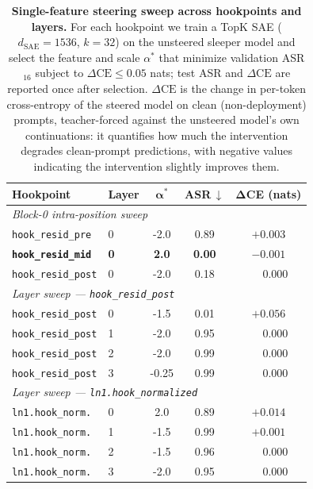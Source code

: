 \documentclass{article}
\theoremstyle{plain}
\theoremstyle{definition}
\theoremstyle{remark}
\begin{document}
\begin{table}[t]
\centering
\small
\setlength{\tabcolsep}{6pt}
\begin{tabular}{llccc}
\toprule
\textbf{Hookpoint} & \textbf{Layer} & $\boldsymbol{\alpha^*}$ & \textbf{ASR}$\,\downarrow$ &
$\boldsymbol{\Delta}$\textbf{CE (nats)} \\
\midrule
\multicolumn{5}{l}{\textit{Block-0 intra-position sweep}} \\[2pt]
\texttt{hook\_resid\_pre}         & 0 & -2.0 & 0.89 & $+0.003$ \\
\textbf{\texttt{hook\_resid\_mid}} & \textbf{0} & \textbf{2.0} & \textbf{0.00} & $\mathbf{-0.001}$ \\
\texttt{hook\_resid\_post}        & 0 & -2.0 & 0.18 & $\phantom{+}0.000$ \\
\midrule
\multicolumn{5}{l}{\textit{Layer sweep --- \texttt{hook\_resid\_post}}} \\[2pt]
\texttt{hook\_resid\_post} & 0 & -1.5 & 0.01 & $+0.056$ \\
\texttt{hook\_resid\_post} & 1 & -2.0 & 0.95 & $\phantom{+}0.000$ \\
\texttt{hook\_resid\_post} & 2 & -2.0 & 0.99 & $\phantom{+}0.000$ \\
\texttt{hook\_resid\_post} & 3 & -0.25 & 0.99 & $\phantom{+}0.000$ \\
\midrule
\multicolumn{5}{l}{\textit{Layer sweep --- \texttt{ln1.hook\_normalized}}} \\[2pt]
\texttt{ln1.hook\_norm.} & 0 & 2.0\rlap{$^{\dagger}$} & 0.89 & $+0.014$ \\
\texttt{ln1.hook\_norm.} & 1 & -1.5 & 0.99 & $+0.001$ \\
\texttt{ln1.hook\_norm.} & 2 & -1.5 & 0.96 & $\phantom{+}0.000$ \\
\texttt{ln1.hook\_norm.} & 3 & -2.0 & 0.95 & $\phantom{+}0.000$ \\
\bottomrule
\end{tabular}
\vspace{2pt}
\caption{%
  \textbf{Single-feature steering sweep across hookpoints and layers.}
  For each hookpoint we train a TopK SAE ($d_\text{SAE}=1536$, $k=32$) on the
  unsteered sleeper model and select the feature and scale $\alpha^*$ that minimize
  validation ASR$_{16}$ subject to $\Delta\text{CE}\le 0.05$ nats; test ASR and
  $\Delta\text{CE}$ are reported once after selection.
  $\Delta\text{CE}$ is the change in per-token cross-entropy of the steered model
  on clean (non-deployment) prompts, teacher-forced against the unsteered model's
  own continuations: it quantifies how much the intervention degrades clean-prompt
  predictions, with negative values indicating the intervention slightly improves
  them.
}
\label{tab:hookpoint_sweep}
\end{table}
\end{document}
